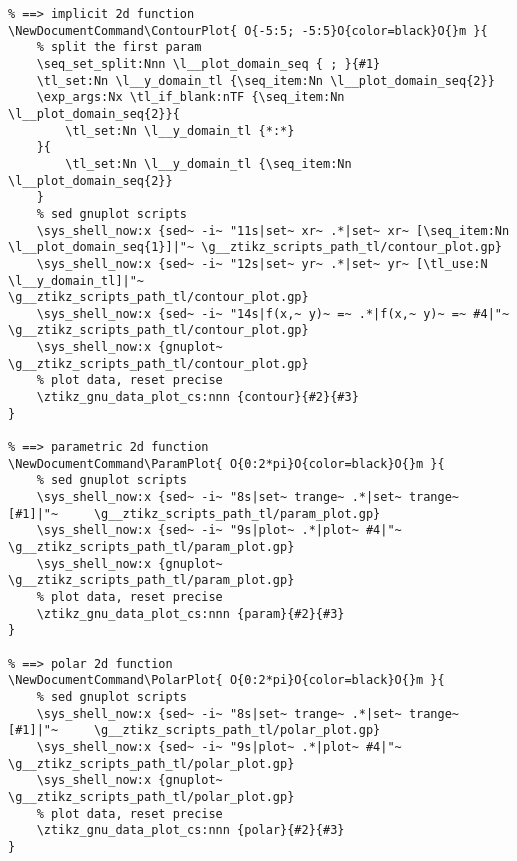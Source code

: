 \begin{verbatim}
% ==> implicit 2d function
\NewDocumentCommand\ContourPlot{ O{-5:5; -5:5}O{color=black}O{}m }{
	% split the first param
    \seq_set_split:Nnn \l__plot_domain_seq { ; }{#1}
    \tl_set:Nn \l__y_domain_tl {\seq_item:Nn \l__plot_domain_seq{2}}
    \exp_args:Nx \tl_if_blank:nTF {\seq_item:Nn \l__plot_domain_seq{2}}{
        \tl_set:Nn \l__y_domain_tl {*:*}
    }{
        \tl_set:Nn \l__y_domain_tl {\seq_item:Nn \l__plot_domain_seq{2}}
    }
    % sed gnuplot scripts
    \sys_shell_now:x {sed~ -i~ "11s|set~ xr~ .*|set~ xr~ [\seq_item:Nn \l__plot_domain_seq{1}]|"~ \g__ztikz_scripts_path_tl/contour_plot.gp}
    \sys_shell_now:x {sed~ -i~ "12s|set~ yr~ .*|set~ yr~ [\tl_use:N \l__y_domain_tl]|"~           \g__ztikz_scripts_path_tl/contour_plot.gp}
    \sys_shell_now:x {sed~ -i~ "14s|f(x,~ y)~ =~ .*|f(x,~ y)~ =~ #4|"~                            \g__ztikz_scripts_path_tl/contour_plot.gp}
    \sys_shell_now:x {gnuplot~                                                                    \g__ztikz_scripts_path_tl/contour_plot.gp}
    % plot data, reset precise
    \ztikz_gnu_data_plot_cs:nnn {contour}{#2}{#3}
}

% ==> parametric 2d function
\NewDocumentCommand\ParamPlot{ O{0:2*pi}O{color=black}O{}m }{
    % sed gnuplot scripts
    \sys_shell_now:x {sed~ -i~ "8s|set~ trange~ .*|set~ trange~ [#1]|"~     \g__ztikz_scripts_path_tl/param_plot.gp}
    \sys_shell_now:x {sed~ -i~ "9s|plot~ .*|plot~ #4|"~                     \g__ztikz_scripts_path_tl/param_plot.gp}
    \sys_shell_now:x {gnuplot~                                              \g__ztikz_scripts_path_tl/param_plot.gp}
    % plot data, reset precise
    \ztikz_gnu_data_plot_cs:nnn {param}{#2}{#3}
}

% ==> polar 2d function
\NewDocumentCommand\PolarPlot{ O{0:2*pi}O{color=black}O{}m }{
    % sed gnuplot scripts
    \sys_shell_now:x {sed~ -i~ "8s|set~ trange~ .*|set~ trange~ [#1]|"~     \g__ztikz_scripts_path_tl/polar_plot.gp}
    \sys_shell_now:x {sed~ -i~ "9s|plot~ .*|plot~ #4|"~                     \g__ztikz_scripts_path_tl/polar_plot.gp}
    \sys_shell_now:x {gnuplot~                                              \g__ztikz_scripts_path_tl/polar_plot.gp}
    % plot data, reset precise
    \ztikz_gnu_data_plot_cs:nnn {polar}{#2}{#3}
}
\end{verbatim}

